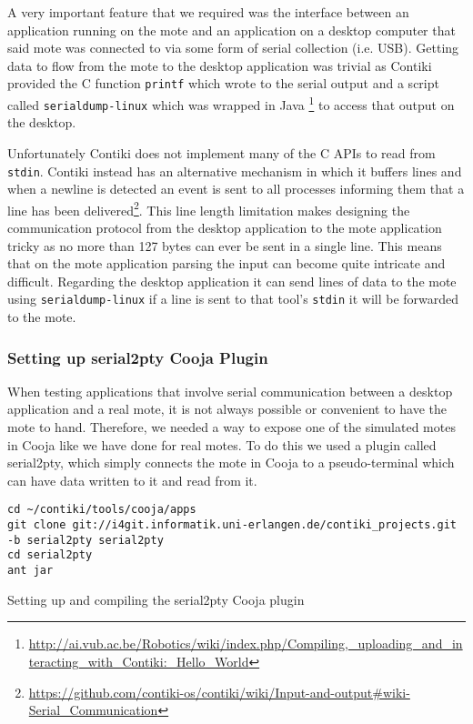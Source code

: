 A very important feature that we required was the interface between an application running on the mote and an application on a desktop computer that said mote was connected to via some form of serial collection (i.e. USB). Getting data to flow from the mote to the desktop application was trivial as Contiki provided the C function \verb|printf| which wrote to the serial output and a script called \verb|serialdump-linux| which was wrapped in Java \footnote{\url{http://ai.vub.ac.be/Robotics/wiki/index.php/Compiling,\_uploading\_and\_interacting\_with\_Contiki:\_Hello_World}} to access that output on the desktop.

Unfortunately Contiki does not implement many of the C APIs to read from \verb|stdin|. Contiki instead has an alternative mechanism in which it buffers lines and when a newline is detected an event is sent to all processes informing them that a line has been delivered\footnote{\url{https://github.com/contiki-os/contiki/wiki/Input-and-output\#wiki-Serial\_Communication}}. This line length limitation makes designing the communication protocol from the desktop application to the mote application tricky as no more than 127 bytes can ever be sent in a single line. This means that on the mote application parsing the input can become quite intricate and difficult. Regarding the desktop application it can send lines of data to the mote using \verb|serialdump-linux| if a line is sent to that tool's \verb|stdin| it will be forwarded to the mote.


\subsubsection{Setting up serial2pty Cooja Plugin}

When testing applications that involve serial communication between a desktop application and a real mote, it is not always possible or convenient to have the mote to hand. Therefore, we needed a way to expose one of the simulated motes in Cooja like we have done for real motes. To do this we used a plugin called serial2pty, which simply connects the mote in Cooja to a pseudo-terminal which can have data written to it and read from it.

\begin{listing}[H]
\begin{verbatim}
cd ~/contiki/tools/cooja/apps
git clone git://i4git.informatik.uni-erlangen.de/contiki_projects.git -b serial2pty serial2pty
cd serial2pty
ant jar
\end{verbatim}
\caption{Setting up and compiling the serial2pty Cooja plugin}
\label{lst:setup-serial2pty}
\end{listing}


